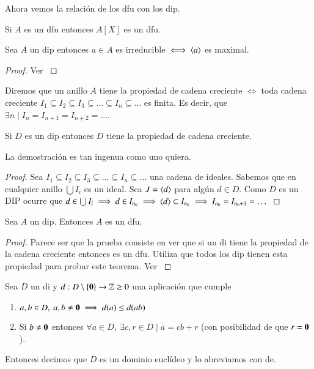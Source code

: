Ahora vemos la relación de los \gls{dfu} con los \gls{dip}.

\begin{pro}
	Si $A$ es un \gls{dfu} entonces $A[X]$ es un \gls{dfu}.
\end{pro}

\begin{thm}
	Sea $A$ un \gls{dip} entonces $a \in A$ es irreducible $\iff \langle a\rangle$ es maximal.
\end{thm}

\begin{proof}
	Ver \cite[p.~247]{dor96}
\end{proof}


\begin{dfn}
	
	Diremos que un anillo $A$ tiene la propiedad de cadena creciente $\iff$ toda cadena creciente $I_1 \subseteq I_2 \subseteq I_3 \subseteq \dots \subseteq I_n \subseteq \dots$ es finita. Es decir, que $\exists n \mid I_n = I_{n+1} = I_{n+2} = \dots$.
\end{dfn}

\begin{pro}
	Si $D$ es un \gls{dip} entonces $D$ tiene la propiedad de cadena creciente.
\end{pro}

La demostración es tan ingenua como uno quiera.

\begin{proof}
	Sea $I_1 \subseteq I_2 \subseteq I_3 \subseteq \dots \subseteq I_n \subseteq \dots$ una cadena de ideales. Sabemos que en cualquier anillo $\bigcup I_i$ es un ideal. Sea $J = \langle d\rangle$ para algún $d \in D$. Como $D$ es un DIP ocurre que $d \in \bigcup I_i \implies d \in I_{n_0} \implies \langle d\rangle \subset I_{n_0} \implies I_{n_0} = I_{n_0 + 1} = \dots$
\end{proof}

\begin{thm}
	Sea $A$ un \gls{dip}. Entonces $A$ es un \gls{dfu}.
\end{thm}

\begin{proof}
	Parece ser que la prueba consiste en ver que si un \gls{di} tiene la propiedad de la cadena creciente entonces es un \gls{dfu}. Utiliza que todos los \gls{dip} tienen esta propiedad para probar este teorema. Ver \cite[p.~248]{dor96}
\end{proof}

\begin{dfn}
	\label{dfn:de}
	Sea $D$ un \gls{di} y $d: D \setminus \{\mathbf{0}\} \to \mathbb{Z} \geq 0$ una aplicación que cumple
	\begin{enumerate}
		\item $a,b \in D,\ a,b \neq \mathbf{0} \implies d(a) \leq d(ab)$
		\item Si $b \neq \mathbf{0}$ entonces $\forall a \in D,\ \exists c,r \in D \mid a = cb+r$ (con posibilidad de que $r = \mathbf{0}$).
	\end{enumerate}
	Entonces decimos que $D$ es un dominio euclídeo y lo abreviamos con \gls{de}.
\end{dfn}

